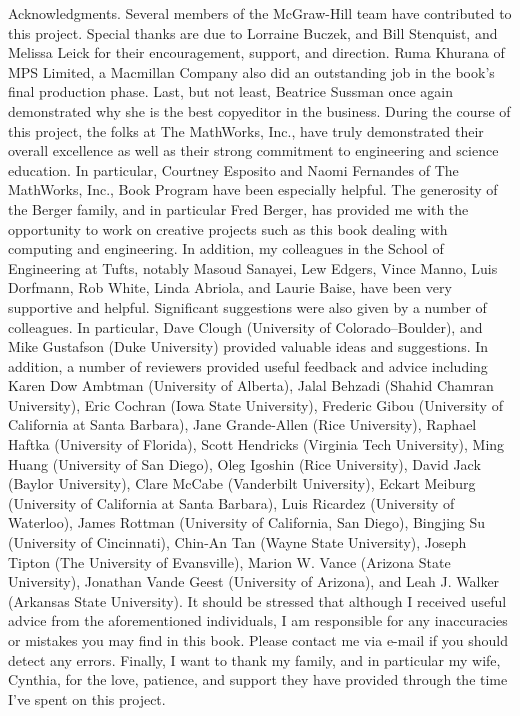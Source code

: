 \documentclass[../main.tex]{subfiles}
\begin{document}
{\color{blue}Acknowledgments}. Several members of the McGraw-Hill team have contributed to
this project. Special thanks are due to Lorraine Buczek, and Bill Stenquist, and Melissa
Leick for their encouragement, support, and direction. Ruma Khurana of MPS Limited, a
Macmillan Company also did an outstanding job in the book’s final production phase. Last,
but not least, Beatrice Sussman once again demonstrated why she is the best copyeditor in
the business.
During the course of this project, the folks at The MathWorks, Inc., have truly demonstrated their overall excellence as well as their strong commitment to engineering and
science education. In particular, Courtney Esposito and Naomi Fernandes of The MathWorks, Inc., Book Program have been especially helpful.
The generosity of the Berger family, and in particular Fred Berger, has provided me
with the opportunity to work on creative projects such as this book dealing with computing
and engineering. In addition, my colleagues in the School of Engineering at Tufts, notably
Masoud Sanayei, Lew Edgers, Vince Manno, Luis Dorfmann, Rob White, Linda Abriola,
and Laurie Baise, have been very supportive and helpful.
Significant suggestions were also given by a number of colleagues. In particular, Dave
Clough (University of Colorado–Boulder), and Mike Gustafson (Duke University) provided valuable ideas and suggestions. In addition, a number of reviewers provided useful
feedback and advice including Karen Dow Ambtman (University of Alberta), Jalal Behzadi
(Shahid Chamran University), Eric Cochran (Iowa State University), Frederic Gibou (University of California at Santa Barbara), Jane Grande-Allen (Rice University), Raphael
Haftka (University of Florida), Scott Hendricks (Virginia Tech University), Ming Huang
(University of San Diego), Oleg Igoshin (Rice University), David Jack (Baylor University), Clare McCabe (Vanderbilt University), Eckart Meiburg (University of California at
Santa Barbara), Luis Ricardez (University of Waterloo), James Rottman (University of
California, San Diego), Bingjing Su (University of Cincinnati), Chin-An Tan (Wayne State
University), Joseph Tipton (The University of Evansville), Marion W. Vance (Arizona
State University), Jonathan Vande Geest (University of Arizona), and Leah J. Walker
(Arkansas State University).
It should be stressed that although I received useful advice from the aforementioned
individuals, I am responsible for any inaccuracies or mistakes you may find in this book.
Please contact me via e-mail if you should detect any errors.
Finally, I want to thank my family, and in particular my wife, Cynthia, for the love,
patience, and support they have provided through the time I’ve spent on this project.
\newpage
\end{document}
